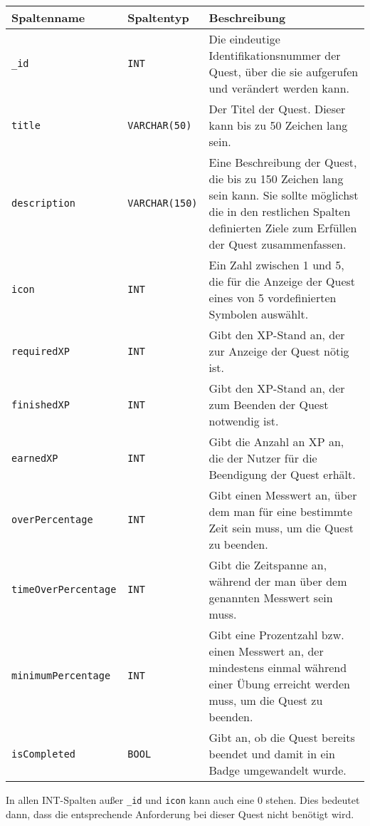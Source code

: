  \begin{longtabu} to \linewidth {|l|l|X|}
	\hline
	\textbf{Spaltenname} & \textbf{Spaltentyp} & \textbf{Beschreibung} \\[0.3em] \hline \endhead
	\texttt{\_id} & \texttt{INT} & Die eindeutige Identifikationsnummer der Quest, über die sie aufgerufen und verändert werden kann. \\[0.5em] \hline	
	\texttt{title} & \texttt{VARCHAR(50)} & Der Titel der Quest. Dieser kann bis zu 50 Zeichen lang sein. \\[0.5em] \hline
	\texttt{description} & \texttt{VARCHAR(150)} & Eine Beschreibung der Quest, die bis zu 150 Zeichen lang sein kann. Sie sollte möglichst die in den restlichen Spalten definierten Ziele zum Erfüllen der Quest zusammenfassen.  \\[0.5em] \hline
	\texttt{icon} & \texttt{INT} & Ein Zahl zwischen 1 und 5, die für die Anzeige der Quest eines von 5 vordefinierten Symbolen auswählt. \\[0.5em] \hline
	\texttt{requiredXP} & \texttt{INT} & Gibt den XP-Stand an, der zur Anzeige der Quest nötig ist. \\[0.5em] \hline
	\texttt{finishedXP} & \texttt{INT} & Gibt den XP-Stand an, der zum Beenden der Quest notwendig ist. \\[0.5em] \hline
	\texttt{earnedXP} & \texttt{INT} & Gibt die Anzahl an XP an, die der Nutzer für die Beendigung der Quest erhält. \\[0.5em] \hline
	\texttt{overPercentage} & \texttt{INT} & Gibt einen Messwert an, über dem man für eine bestimmte Zeit sein muss, um die Quest zu beenden. \\[0.5em] \hline
	\texttt{timeOverPercentage} & \texttt{INT} & Gibt die Zeitspanne an, während der man über dem genannten Messwert sein muss. \\[0.5em] \hline
	\texttt{minimumPercentage} & \texttt{INT} & Gibt eine Prozentzahl bzw. einen Messwert an, der mindestens einmal während einer Übung erreicht werden muss, um die Quest zu beenden. \\[0.5em] \hline
	\texttt{isCompleted} & \texttt{BOOL} & Gibt an, ob die Quest bereits beendet und damit in ein Badge umgewandelt wurde. \\[0.5em] \hline
\end{longtabu}
In allen INT-Spalten außer \texttt{\_id} und \texttt{icon} kann auch eine $0$ stehen. Dies bedeutet dann, dass die entsprechende Anforderung bei dieser Quest nicht benötigt wird. \\ \\
